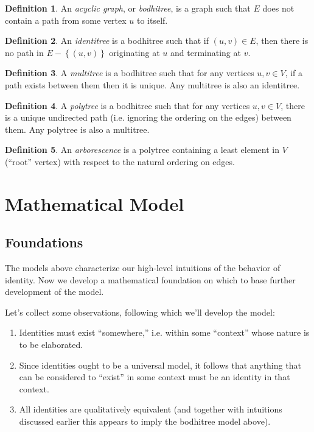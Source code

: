 \documentclass[pra,twocolumn,groupedaddress,10pt]{revtex4}
\theoremstyle{definition}
\newtheorem{defn}{Definition}[section]
\begin{document}
\begin{defn}
	An \emph{acyclic graph}, or \emph{bodhitree}, is a graph such that $E$ does not contain a path from some vertex $u$ to itself.
\end{defn}

\begin{defn}
	An \emph{identitree} is a bodhitree such that if $(u, v) \in E$, then there is no path in $E - \left\{\left(u, v\right)\right\}$ originating at $u$ and terminating at $v$.
\end{defn}

\begin{defn}
	A \emph{multitree} is a bodhitree such that for any vertices $u, v \in V$, if a path exists between them then it is unique. Any multitree is also an identitree.
\end{defn}

\begin{defn}
	A \emph{polytree} is a bodhitree such that for any vertices $u, v \in V$, there is a unique undirected path (i.e. ignoring the ordering on the edges) between them. Any polytree is also a multitree.
\end{defn}

\begin{defn}
	An \emph{arborescence} is a polytree containing a least element in $V$ (``root'' vertex) with respect to the natural ordering on edges.
\end{defn}

\section{Mathematical Model} \label{sec:matmod}

\subsection{Foundations} \label{sec:foundations}

The models above characterize our high-level intuitions of the behavior of identity. Now we develop a mathematical foundation on which to base further development of the model.

Let's collect some observations, following which we'll develop the model:

\begin{enumerate}
	\item Identities must exist ``somewhere,'' i.e. within some ``context'' whose nature is to be elaborated.
	\item Since identities ought to be a universal model, it follows that anything that can be considered to ``exist'' in some context must be an identity in that context.
	\item All identities are qualitatively equivalent (and together with intuitions discussed earlier this appears to imply the bodhitree model above).
\end{enumerate}
\end{document}
